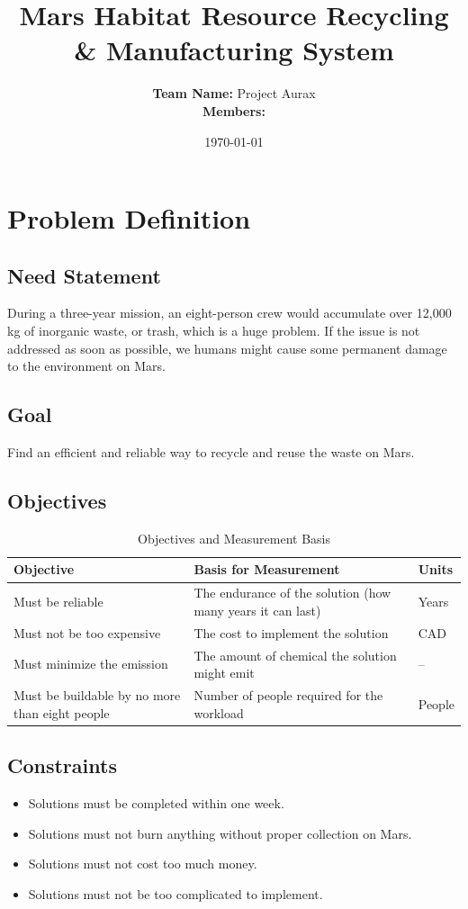 \documentclass[12pt, a4paper]{article}
\title{\textbf{Mars Habitat Resource Recycling \& Manufacturing System}}
\author{%
    \textbf{Team Name:} Project Aurax \\[0.3em]
    \textbf{Members:} 
}
\date{\today}
\begin{document}
\maketitle

\section{Problem Definition}

\subsection{Need Statement}
During a three-year mission, an eight-person crew would accumulate over 12,000 kg of inorganic waste, or trash, which is a huge problem. If the issue is not addressed as soon as possible, we humans might cause some permanent damage to the environment on Mars.

\subsection{Goal}
Find an efficient and reliable way to recycle and reuse the waste on Mars.

\subsection{Objectives}

\begin{table}[h!]
\centering
\renewcommand{\arraystretch}{1.3} %
\setlength{\tabcolsep}{8pt} %
\begin{tabular}{p{} p{} p{}}
\toprule
\textbf{Objective} & \textbf{Basis for Measurement} & \textbf{Units} \\ 
\midrule
Must be reliable & The endurance of the solution (how many years it can last) & Years \\[0.3em]
Must not be too expensive & The cost to implement the solution & CAD \\[0.3em]
Must minimize the emission & The amount of chemical the solution might emit & -- \\[0.3em]
Must be buildable by no more than eight people & Number of people required for the workload & People \\
\bottomrule
\end{tabular}
\caption{Objectives and Measurement Basis}
\end{table}

\newpage 
\subsection{Constraints}
\begin{itemize}
    \item Solutions must be completed within one week.
    \item Solutions must not burn anything without proper collection on Mars.
    \item Solutions must not cost too much money.
    \item Solutions must not be too complicated to implement.
\end{itemize}
\end{document}
